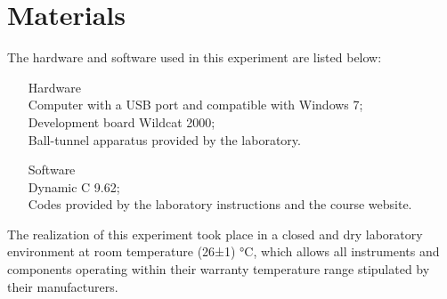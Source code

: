 \section{Materials}

The hardware and software used in this experiment are listed below:

\begin{enumerate}
\item[Hardware]
\\ Computer with a USB port and compatible with Windows 7;
\\ Development board Wildcat 2000;
\\ Ball-tunnel apparatus provided by the laboratory.
\\
\item[Software]
\\ Dynamic C 9.62;
\\ Codes provided by the laboratory instructions and the course website.
\\
\end{enumerate}
The realization of this experiment took place in a closed and dry laboratory environment at room temperature (26±1)  °C, which allows all instruments and components operating within their warranty temperature range stipulated by their manufacturers.
